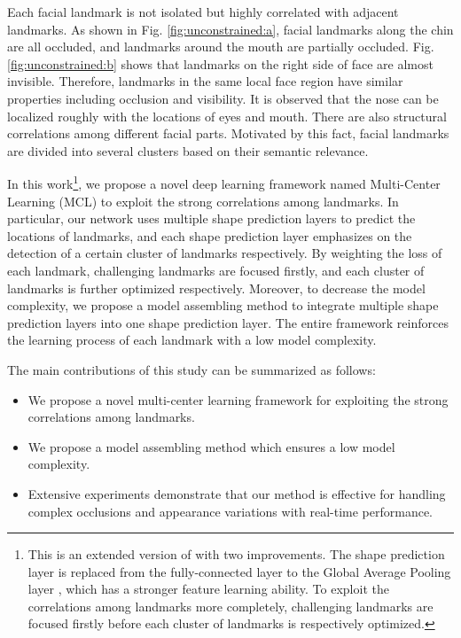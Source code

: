 \documentclass[journal]{IEEEtran}
\begin{document}
Each facial landmark is not isolated but highly correlated with adjacent landmarks. As shown in Fig. \ref{fig:unconstrained:a}, facial landmarks along the chin are all occluded, and landmarks around the mouth are partially occluded. Fig. \ref{fig:unconstrained:b} shows that landmarks on the right side of face are almost invisible. Therefore, landmarks in the same local face region have similar properties including occlusion and visibility. It is observed that the nose can be localized roughly with the locations of eyes and mouth. There are also structural correlations among different facial parts. Motivated by this fact, facial landmarks are divided into several clusters based on their semantic relevance.

In this work\footnote{This is an extended version of \cite{shao2017learning} with two improvements. The shape prediction layer is replaced from the fully-connected layer to the Global Average Pooling layer \cite{lin2013network}, which has a stronger feature learning ability. To exploit the correlations among landmarks more completely, challenging landmarks are focused firstly before each cluster of landmarks is respectively optimized.}, we propose a novel deep learning framework named Multi-Center Learning (MCL) to exploit the strong correlations among landmarks. In particular, our network uses multiple shape prediction layers to predict the locations of landmarks, and each shape prediction layer emphasizes on the detection of a certain cluster of landmarks respectively. By weighting the loss of each landmark, challenging landmarks are focused firstly, and each cluster of landmarks is further optimized respectively. Moreover, to decrease the model complexity, we propose a model assembling method to integrate multiple shape prediction layers into one shape prediction layer. The entire framework reinforces the learning process of each landmark with a low model complexity.

The main contributions of this study can be summarized as follows:
\begin{itemize}
    \item We propose a novel multi-center learning framework for exploiting the strong correlations among landmarks.
    \item We propose a model assembling method which ensures a low model complexity.
    \item Extensive experiments demonstrate that our method is effective for handling complex occlusions and appearance variations with real-time performance.
\end{itemize}
\end{document}
